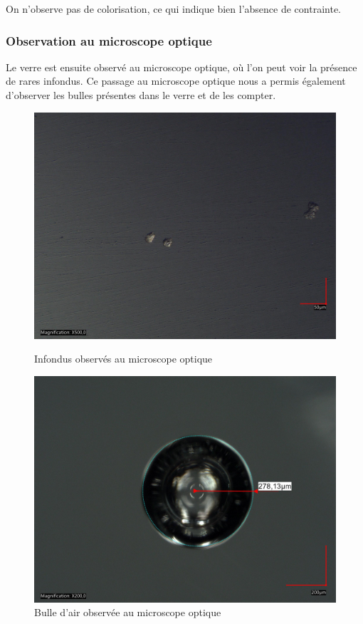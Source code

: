 \documentclass{article}
\begin{document}
On n'observe pas de colorisation, ce qui indique bien l'absence de contrainte.

\subsubsection{Observation au microscope optique}

Le verre est ensuite observé au microscope optique, où l'on peut voir la présence de rares infondus. Ce passage au microscope optique nous a permis également d'observer les bulles présentes dans le verre et de les compter.

\begin{figure}[ht]
    \centering
    \begin{minipage}{0.45\textwidth}
        \centering
        \includegraphics[width=\textwidth]{photos/impuetée2.jpg}
        \caption{Infondus observés au microscope optique}
    \end{minipage}
    \hspace{0.5cm}
    \begin{minipage}{0.45\textwidth}
        \centering
        \includegraphics[width=\textwidth]{photos/rayon 1 modified.jpg}
        \caption{Bulle d'air observée au microscope optique}
    \end{minipage}
\end{figure}
\end{document}
